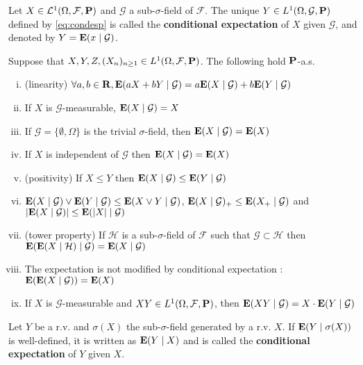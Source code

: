 	\begin{defn}
		Let $X \in \mathcal{L}^1(\Omega, \mathcal{F}, \mathbf{P})$ and $\mathcal{G}$ a sub-$\sigma$-field of $\mathcal{F}$.
		The unique $Y \in L^1(\Omega, \mathcal{G}, \mathbf{P})$ defined by \eqref{eq:condesp} is called the \textbf{conditional expectation} of $X$ given $\mathcal{G}$, and denoted by $Y = \mathbf{E}(x \mid \mathcal{G})$.
	\end{defn}

	\begin{pop}
		Suppose that $X, Y, Z, (X_n)_{n \geq 1} \in L^1(\Omega, \mathcal{F}, \mathbf{P})$.
		The following hold $\mathbf{P}$-a.s.
		\begin{enumerate}[(i)]
			\item (linearity) $\forall a, b \in \mathbf{R}, \mathbf{E}(aX + bY \mid \mathcal{G}) = a \mathbf{E}(X \mid \mathcal{G}) + b \mathbf{E}(Y \mid \mathcal{G})$
			\item If $X$ is $\mathcal{G}$-measurable, $\mathbf{E}(X \mid \mathcal{G}) = X$
			\item If $\mathcal{G} = \{ \emptyset, \Omega \}$ is the trivial $\sigma$-field, then $\mathbf{E}(X \mid \mathcal{G}) = \mathbf{E}(X)$
			\item If $X$ is independent of $\mathcal{G}$ then $\mathbf{E}(X \mid \mathcal{G}) = \mathbf{E}(X)$
			\item (positivity) If $X \leq Y$ then $\mathbf{E}(X \mid \mathcal{G}) \leq \mathbf{E}(Y \mid \mathcal{G})$
			\item $\mathbf{E}(X \mid \mathcal{G}) \vee \mathbf{E}(Y \mid \mathcal{G}) \leq \mathbf{E}(X \vee Y \mid \mathcal{G})$,
				$\mathbf{E}(X \mid \mathcal{G})_+ \leq \mathbf{E}(X_+ \mid \mathcal{G})$ and
				$\left\lvert\mathbf{E}(X \mid \mathcal{G})\right\rvert \leq \mathbf{E}(\left\lvert X\right\rvert \mid \mathcal{G})$
			\item (tower property) If $\mathcal{H}$ is a sub-$\sigma$-field of $\mathcal{F}$ such that $\mathcal{G} \subset \mathcal{H}$ then $\mathbf{E}( \mathbf{E}(X \mid \mathcal{H}) \mid \mathcal{G}) = \mathbf{E}(X \mid \mathcal{G})$
			\item The expectation is not modified by conditional expectation : $\mathbf{E}( \mathbf{E}(X \mid \mathcal{G}) ) = \mathbf{E}(X)$
			\item If $X$ is $\mathcal{G}$-measurable and $XY \in L^1(\Omega, \mathcal{F}, \mathbf{P})$, then $\mathbf{E}(XY \mid \mathcal{G}) = X \cdot \mathbf{E}(Y \mid \mathcal{G})$ 
		\end{enumerate} 
	\end{pop}

	\begin{defn}
		Let $Y$ be a r.v. and $\sigma(X)$ the sub-$\sigma$-field generated by a r.v. $X$.
		If $\mathbf{E}(Y \mid \sigma(X))$ is well-defined, it is written as $\mathbf{E}(Y \mid X)$ and is called the \textbf{conditional expectation} of $Y$ given $X$.
	\end{defn}
	
